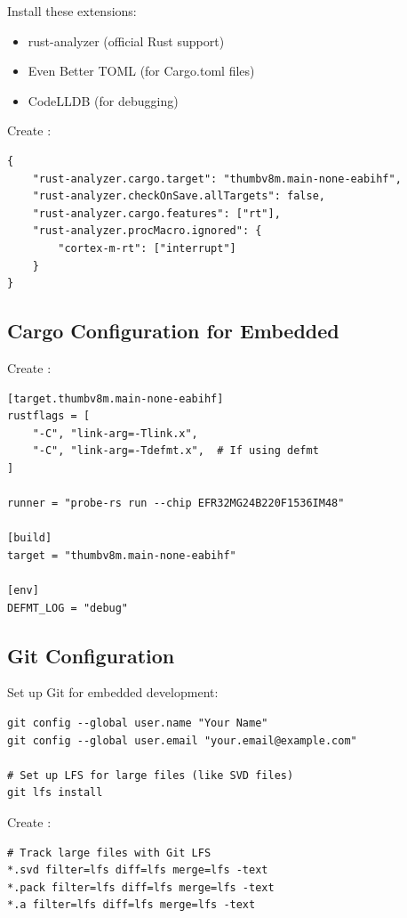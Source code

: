 Install these extensions:
\begin{itemize}
    \item rust-analyzer (official Rust support)
    \item Even Better TOML (for Cargo.toml files)
    \item CodeLLDB (for debugging)
\end{itemize}

Create :
\begin{verbatim}
{
    "rust-analyzer.cargo.target": "thumbv8m.main-none-eabihf",
    "rust-analyzer.checkOnSave.allTargets": false,
    "rust-analyzer.cargo.features": ["rt"],
    "rust-analyzer.procMacro.ignored": {
        "cortex-m-rt": ["interrupt"]
    }
}
\end{verbatim}

\subsection{Cargo Configuration for Embedded}
\label{subsec:cargo-config}

Create :
\begin{verbatim}
[target.thumbv8m.main-none-eabihf]
rustflags = [
    "-C", "link-arg=-Tlink.x",
    "-C", "link-arg=-Tdefmt.x",  # If using defmt
]

runner = "probe-rs run --chip EFR32MG24B220F1536IM48"

[build]
target = "thumbv8m.main-none-eabihf"

[env]
DEFMT_LOG = "debug"
\end{verbatim}

\subsection{Git Configuration}
\label{subsec:git-config}

Set up Git for embedded development:
\begin{verbatim}
git config --global user.name "Your Name"
git config --global user.email "your.email@example.com"

# Set up LFS for large files (like SVD files)
git lfs install
\end{verbatim}

Create :
\begin{verbatim}
# Track large files with Git LFS
*.svd filter=lfs diff=lfs merge=lfs -text
*.pack filter=lfs diff=lfs merge=lfs -text
*.a filter=lfs diff=lfs merge=lfs -text
\end{verbatim}

